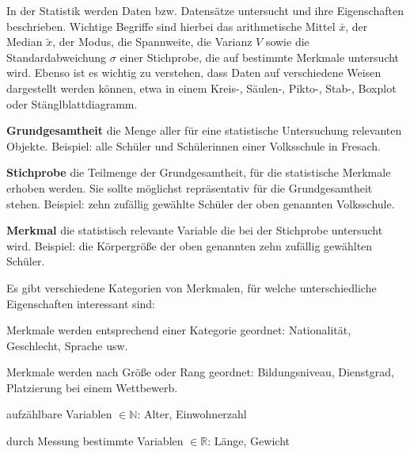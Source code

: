 



\thispagestyle{plain}



In der Statistik werden Daten bzw. Datens\"{a}tze untersucht und ihre Eigenschaften beschrieben. Wichtige Begriffe sind hierbei das arithmetische Mittel $\bar{x}$, der Median $\tilde{x}$, der Modus, die Spannweite, die Varianz $V$ sowie die Standardabweichung $\sigma$ einer Stichprobe, die auf bestimmte Merkmale untersucht wird. Ebenso ist es wichtig zu verstehen, dass Daten auf verschiedene Weisen dargestellt werden k\"{o}nnen, etwa in einem Kreis-, S\"{a}ulen-, Pikto-, Stab-, Boxplot oder St\"{a}nglblattdiagramm. 


\textbf{Grundgesamtheit}  die Menge aller f\"{u}r eine statistische Untersuchung relevanten Objekte. Beispiel: alle Sch\"{u}ler und Sch\"{u}lerinnen einer Volksschule in Fresach.

\textbf{Stichprobe}  die Teilmenge der Grundgesamtheit, f\"{u}r die statistische Merkmale erhoben werden. Sie sollte m\"{o}glichst repr\"{a}sentativ f\"{u}r die Grundgesamtheit stehen. Beispiel: zehn zuf\"{a}llig gew\"{a}hlte Sch\"{u}ler der oben genannten Volksschule.

\textbf{Merkmal}  die statistisch relevante Variable die bei der Stichprobe untersucht wird. Beispiel: die K\"{o}rpergr\"{o}\ss{}e der oben genannten zehn zuf\"{a}llig gew\"{a}hlten Sch\"{u}ler. 

Es gibt verschiedene Kategorien von Merkmalen, f\"{u}r welche unterschiedliche Eigenschaften interessant sind:

\begin{itemize}


	Merkmale werden entsprechend einer Kategorie geordnet: Nationalit\"{a}t, Geschlecht, Sprache usw.


	Merkmale werden nach Gr\"{o}\ss{}e oder Rang geordnet: Bildungsniveau, Dienstgrad, Platzierung bei einem Wettbewerb.


		\begin{itemize}

			  aufz\"{a}hlbare Variablen $\in \mathbb{N}$: Alter, Einwohnerzahl

			  durch Messung bestimmte Variablen $\in \mathbb{R}$: L\"{a}nge, Gewicht

		\end{itemize}

\end{itemize}

